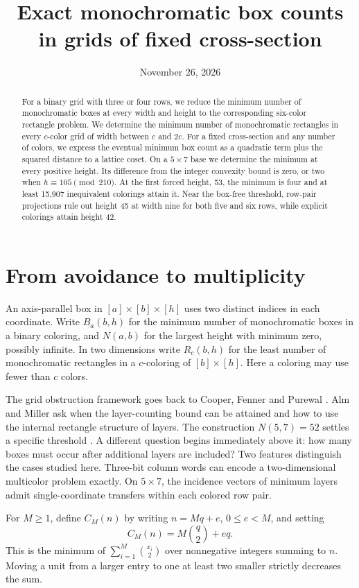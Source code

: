 \documentclass[11pt]{article}
\title{Exact monochromatic box counts in grids of fixed cross-section}
\author{}\date{November 26, 2026}
\begin{document}
\maketitle
\begin{abstract}
For a binary grid with three or four rows, we reduce the minimum number of monochromatic boxes at every width and height to the corresponding six-color rectangle problem. We determine the minimum number of monochromatic rectangles in every $c$-color grid of width between $c$ and $2c$. For a fixed cross-section and any number of colors, we express the eventual minimum box count as a quadratic term plus the squared distance to a lattice coset. On a $5\times7$ base we determine the minimum at every positive height. Its difference from the integer convexity bound is zero, or two when $h\equiv105\pmod{210}$. At the first forced height, 53, the minimum is four and at least 15,907 inequivalent colorings attain it. Near the box-free threshold, row-pair projections rule out height 45 at width nine for both five and six rows, while explicit colorings attain height 42.
\end{abstract}

\section{From avoidance to multiplicity}
An axis-parallel box in $[a]\times[b]\times[h]$ uses two distinct indices in each coordinate. Write $B_a(b,h)$ for the minimum number of monochromatic boxes in a binary coloring, and $N(a,b)$ for the largest height with minimum zero, possibly infinite. In two dimensions write $R_c(b,h)$ for the least number of monochromatic rectangles in a $c$-coloring of $[b]\times[h]$. Here a coloring may use fewer than $c$ colors.

The grid obstruction framework goes back to Cooper, Fenner and Purewal \cite{cfp}. Alm and Miller \cite[\S8]{alm} ask when the layer-counting bound can be attained and how to use the internal rectangle structure of layers. The construction $N(5,7)=52$ settles a specific threshold \cite{data}. A different question begins immediately above it: how many boxes must occur after additional layers are included? Two features distinguish the cases studied here. Three-bit column words can encode a two-dimensional multicolor problem exactly. On $5\times7$, the incidence vectors of minimum layers admit single-coordinate transfers within each colored row pair.

For $M\ge1$, define $C_M(n)$ by writing $n=Mq+e$, $0\le e<M$, and setting
\[
 C_M(n)=M\binom q2+eq .
\]
This is the minimum of $\sum_{i=1}^M\binom{x_i}{2}$ over nonnegative integers summing to $n$. Moving a unit from a larger entry to one at least two smaller strictly decreases the sum.
\end{document}
